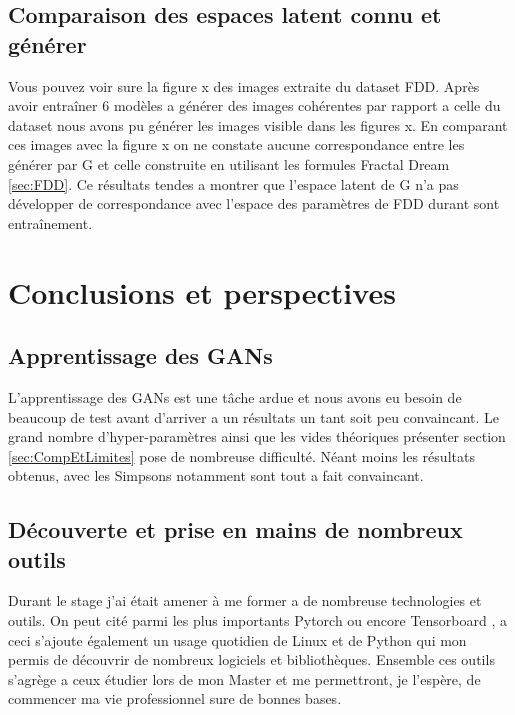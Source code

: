 \documentclass[11pt,francais]{article}
\begin{document}
\subsection{Comparaison des espaces latent connu et générer}
\label{sec:ComparaisonLS}
Vous pouvez voir sure la figure x des images extraite du dataset FDD.
Après avoir entraîner 6 modèles a générer des images cohérentes par rapport a celle du dataset nous avons pu générer les images visible dans les figures x. 
En comparant ces images avec la figure x on ne constate aucune correspondance entre les générer par G et celle construite en utilisant les formules Fractal Dream \ref{sec:FDD}.
Ce résultats tendes a montrer que l'espace latent de G n'a pas développer de correspondance avec l'espace des paramètres de FDD durant sont entraînement. 


\section{Conclusions et perspectives}
\label{sec:Conclusion}

\subsection{Apprentissage des GANs}
L'apprentissage des GANs est une tâche ardue et nous avons eu besoin de beaucoup de test avant d'arriver a un résultats un tant soit peu convaincant. Le grand nombre d'hyper-paramètres ainsi que les vides théoriques présenter section \ref{sec:CompEtLimites} pose de nombreuse difficulté. Néant moins les résultats obtenus, avec les Simpsons notamment sont tout a fait convaincant.

\subsection{Découverte et prise en mains de nombreux outils}
Durant le stage j'ai était amener à me former a de nombreuse technologies et outils.
On peut cité parmi les plus importants Pytorch \cite{paszke2017automatic} ou encore Tensorboard \cite{tensorflow2015-whitepaper}, a ceci s'ajoute également un usage quotidien de Linux et de Python qui mon permis de découvrir de nombreux logiciels et bibliothèques.
Ensemble ces outils s'agrège a ceux étudier lors de mon Master et me permettront, je l'espère, de commencer ma vie professionnel sure de bonnes bases.
\end{document}

